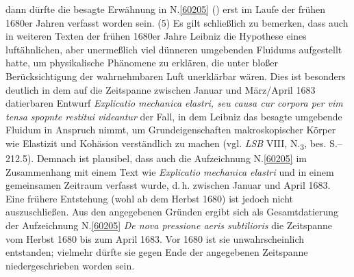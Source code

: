 dann dürfte die besagte Erwähnung in N.\;\ref{60205} () erst im Laufe der frühen 1680er Jahren verfasst worden sein.
\pend%
\pstart%
(5)
Es gilt schließlich zu bemerken, dass auch in weiteren Texten der frühen 1680er Jahre Leibniz die Hypothese eines luftähnlichen, aber unermeßlich viel dünneren umgebenden Fluidums aufgestellt hatte, um physikalische Phänomene zu erklären, die unter bloßer Berücksichtigung der wahrnehmbaren Luft unerklärbar wären.
Dies ist besonders deutlich in dem auf die Zeitspanne zwischen Januar und März/April 1683 datierbaren Entwurf \textit{Explicatio mechanica elastri, seu causa cur corpora per vim tensa spopnte restitui videantur}\cite{01437} der Fall, in dem Leibniz das besagte umgebende Fluidum in Anspruch nimmt, um Grundeigenschaften makroskopischer Körper wie Elastizit und Kohäsion verständlich zu machen (vgl. \textit{LSB} VIII, N.\textsubscript{3}, bes. S.--212.5).
Demnach ist plausibel, dass auch die Aufzeichnung N.\;\ref{60205} im Zusammenhang mit einem Text wie \textit{Explicatio mechanica elastri} und in einem gemeinsamen Zeitraum verfasst wurde, d.\,h. zwischen Januar und April 1683.
Eine frühere Entstehung (wohl ab dem Herbst 1680) ist jedoch nicht auszuschließen.
\pend%
\pstart%
Aus den angegebenen Gründen ergibt sich als Gesamtdatierung der Aufzeichnung N.\;\ref{60205} \textit{De nova pressione aeris subtilioris} %
die Zeitspanne vom Herbst 1680 bis zum April 1683.
Vor 1680 ist sie unwahrscheinlich entstanden;
vielmehr dürfte sie gegen Ende der angegebenen Zeitspanne niedergeschrieben worden sein.
\pend%
%
\frenchspacing%
\newpage%
